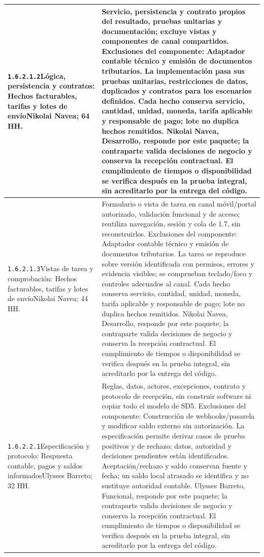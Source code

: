 \begin{longtable}{L{52mm}L{91mm}}
\texttt{1.\allowbreak{}6.\allowbreak{}2.\allowbreak{}1.\allowbreak{}2}\newline Lógica, persistencia y contratos: Hechos facturables, tarifas y lotes de envío\newline Nikolai Navea; 64 HH. & Servicio, persistencia y contrato propios del resultado, pruebas unitarias y documentación; excluye vistas y componentes de canal compartidos. Exclusiones del componente: Adaptador contable técnico y emisión de documentos tributarios. La implementación pasa sus pruebas unitarias, restricciones de datos, duplicados y contratos para los escenarios definidos. Cada hecho conserva servicio, cantidad, unidad, moneda, tarifa aplicable y responsable de pago; lote no duplica hechos remitidos. Nikolai Navea, Desarrollo, responde por este paquete; la contraparte valida decisiones de negocio y conserva la recepción contractual. El cumplimiento de tiempos o disponibilidad se verifica después en la prueba integral, sin acreditarlo por la entrega del código.\\\hline
\texttt{1.\allowbreak{}6.\allowbreak{}2.\allowbreak{}1.\allowbreak{}3}\newline Vistas de tarea y comprobación: Hechos facturables, tarifas y lotes de envío\newline Nikolai Navea; 44 HH. & Formulario o vista de tarea en canal móvil/portal autorizado, validación funcional y de acceso; reutiliza navegación, sesión y cola de 1.7, sin reconstruirlos. Exclusiones del componente: Adaptador contable técnico y emisión de documentos tributarios. La tarea se reproduce sobre versión identificada con permisos, errores y evidencia visibles; se comprueban teclado/foco y controles adecuados al canal. Cada hecho conserva servicio, cantidad, unidad, moneda, tarifa aplicable y responsable de pago; lote no duplica hechos remitidos. Nikolai Navea, Desarrollo, responde por este paquete; la contraparte valida decisiones de negocio y conserva la recepción contractual. El cumplimiento de tiempos o disponibilidad se verifica después en la prueba integral, sin acreditarlo por la entrega del código.\\\hline
\texttt{1.\allowbreak{}6.\allowbreak{}2.\allowbreak{}2.\allowbreak{}1}\newline Especificación y protocolo: Respuesta contable, pagos y saldos informados\newline Ulysses Barreto; 32 HH. & Reglas, datos, actores, excepciones, contrato y protocolo de recepción, sin construir software ni copiar todo el modelo de SD5. Exclusiones del componente: Construcción de webhooks/pasarela y modificar saldo externo sin autorización. La especificación permite derivar casos de prueba positivos y de rechazo; datos, autoridad y decisiones pendientes están identificados. Aceptación/rechazo y saldo conservan fuente y fecha; un saldo local atrasado se identifica y no sustituye autoridad contable. Ulysses Barreto, Funcional, responde por este paquete; la contraparte valida decisiones de negocio y conserva la recepción contractual. El cumplimiento de tiempos o disponibilidad se verifica después en la prueba integral, sin acreditarlo por la entrega del código.\\\hline

\end{longtable}

